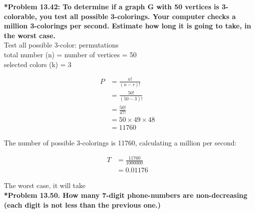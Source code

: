 \documentclass{article}
\begin{document}
    \noindent \textbf{*Problem 13.42: To determine if a graph G with 50 vertices is 3-colorable, you test all possible 3-colorings. Your computer checks a million 3-colorings per second. Estimate how long it is going to take, in the worst case.}
    \\ Test all possible 3-color: permutations
    \\ total number (n) = number of vertices = 50
    \\ selected colors (k) = 3

    \begin{align*}
        P &= \frac{n!}{(n-r)!}\\
        &= \frac{50!}{(50-3)!}\\
        &= \frac{50!}{47!}\\
        &= 50 \times 49 \times 48\\
        &= 11760
    \end{align*}

    The number of possible 3-colorings is 11760, calculating a million per second:

    \begin{align*}
        T &= \frac{11760}{1000000}\\
        &= 0.01176
    \end{align*}

    The worst case, it will take 
    \\[0.25in]
    \noindent \textbf{*Problem 13.50. How many 7-digit phone-numbers are non-decreasing (each digit is not less than the previous one.)}
    
\end{document}
